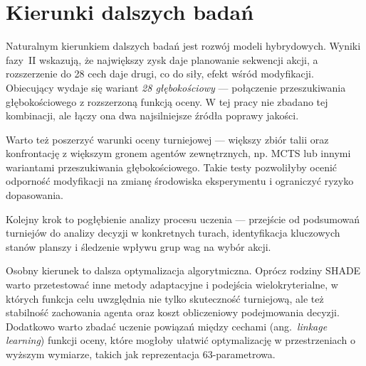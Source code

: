 \section{Kierunki dalszych badań}

Naturalnym kierunkiem dalszych badań jest rozwój modeli hybrydowych. Wyniki fazy~II wskazują, że największy zysk daje planowanie sekwencji akcji, a rozszerzenie do 28 cech daje drugi, co do siły, efekt wśród modyfikacji. Obiecujący wydaje się wariant \textit{28 głębokościowy} --- połączenie przeszukiwania głębokościowego z rozszerzoną funkcją oceny. W tej pracy nie zbadano tej kombinacji, ale łączy ona dwa najsilniejsze źródła poprawy jakości.

Warto też poszerzyć warunki oceny turniejowej --- większy zbiór talii oraz konfrontację z większym gronem agentów zewnętrznych, np. MCTS lub innymi wariantami przeszukiwania głębokościowego. Takie testy pozwoliłyby ocenić odporność modyfikacji na zmianę środowiska eksperymentu i ograniczyć ryzyko dopasowania.

Kolejny krok to pogłębienie analizy procesu uczenia --- przejście od podsumowań turniejów do analizy decyzji w konkretnych turach, identyfikacja kluczowych stanów planszy i śledzenie wpływu grup wag na wybór akcji.

Osobny kierunek to dalsza optymalizacja algorytmiczna. Oprócz rodziny SHADE warto przetestować inne metody adaptacyjne i podejścia wielokryterialne, w których funkcja celu uwzględnia nie tylko skuteczność turniejową, ale też stabilność zachowania agenta oraz koszt obliczeniowy podejmowania decyzji. Dodatkowo warto zbadać uczenie powiązań między cechami (ang.~\textit{linkage learning}) funkcji oceny, które mogłoby ułatwić optymalizację w przestrzeniach o wyższym wymiarze, takich jak reprezentacja 63-parametrowa.